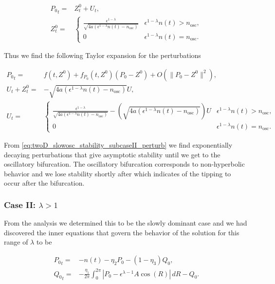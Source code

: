 \begin{equation}
\begin{aligned}
{P_0}_t =& Z^0_t+U_t,\\
Z^0_t=&\begin{cases}
\frac{\epsilon^{1-\lambda}}{\sqrt{4a(\epsilon^{1-\lambda}n(t)-n_{\text{osc}})}} & \epsilon^{1-\lambda}n(t)>n_{\text{osc}},\\
0 & \epsilon^{1-\lambda}n(t)=n_{\text{osc}}.
\end{cases}
\end{aligned}
\end{equation}

Thus we find the following Taylor expansion for the perturbations

\begin{equation}\label{eq:twoD_slowosc_stability_subcaseII_perturb}
\begin{aligned}
{P_0}_t =& f(t,Z^0)+f_{P_0}(t,Z^0)(P_0-Z^0)+O(\lVert P_0-Z^0 \rVert^2),\\
U_t+Z^0_t=& -\sqrt{4a(\epsilon^{1-\lambda}n(t)-n_{\text{osc}})} U,\\
 U_t = & \begin{cases}
\frac{\epsilon^{1-\lambda}}{\sqrt{4a(\epsilon^{1-\lambda}n(t)-n_{\text{osc}})}}-\left(\sqrt{4a(\epsilon^{1-\lambda}n(t)-n_{\text{osc}})}\right) U & \epsilon^{1-\lambda}n(t)>n_{\text{osc}},\\
0 & \epsilon^{1-\lambda}n(t)=n_{\text{osc}}.
\end{cases}
\end{aligned}
\end{equation}

From \eqref{eq:twoD_slowosc_stability_subcaseII_perturb} we find exponentially decaying perturbations that give asymptotic stability until we get to the oscillatory bifurcation. The oscillatory bifurcation corresponds to non-hyperbolic behavior and we lose stability shortly after which indicates of the tipping to occur after the bifurcation.

\subsubsection{Case II: $\lambda>1$}

From the analysis we determined this to be the slowly dominant case and we had discovered the inner equations that govern the behavior of the solution for this range of $\lambda$ to be

\begin{equation}\label{eq:twoD_slowosc_caseII_full}
\begin{aligned}
{P_0}_t =& - n(t)-\eta_2 P_0 -(1-\eta_3)Q_0,\\
{Q_0}_t =& -\frac{\eta_1}{2\pi}\int_0^{2\pi}|P_0-\epsilon^{\lambda-1} A\cos(R)|\,dR - Q_0.
\end{aligned}
\end{equation}


